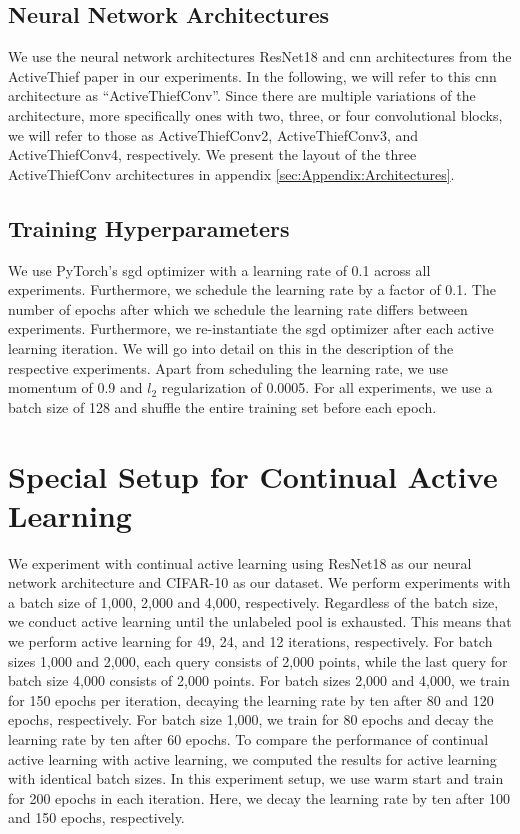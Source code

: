 \subsection{Neural Network Architectures}
\label{sec:ExperimentSetup:NNArchitectures}
We use the neural network architectures ResNet18 \cite{he2016deep} and \gls{cnn} architectures from the ActiveThief paper \cite{pal2020activethief} in our experiments.
In the following, we will refer to this \gls{cnn} architecture as \enquote{ActiveThiefConv}. Since there are multiple variations of the architecture, more specifically
ones with two, three, or four convolutional blocks, we will refer to those as ActiveThiefConv2, ActiveThiefConv3, and ActiveThiefConv4, respectively. We present the
layout of the three ActiveThiefConv architectures in appendix \ref{sec:Appendix:Architectures}.


\subsection{Training Hyperparameters}
\label{sec:ExperimentSetup:Hyperparameters}
We use PyTorch's \gls{sgd} optimizer with a learning rate of 0.1 across all experiments. Furthermore, we schedule the learning rate by a factor of 0.1. The number of
epochs after which we schedule the learning rate differs between experiments. Furthermore, we re-instantiate the \gls{sgd} optimizer after each active learning
iteration. We will go into detail on this in the description of the respective experiments. Apart from scheduling the learning rate, we use momentum \cite{cutkosky2020momentum}
of 0.9 and $l_2$ regularization of 0.0005. For all experiments, we use a batch size of 128 and shuffle the entire training set before each epoch.


\section{Special Setup for Continual Active Learning}
\label{sec:Methodology:CALsetup}
We experiment with continual active learning using ResNet18 as our neural network architecture and CIFAR-10 as our dataset. We perform experiments with a batch size of 1,000,
2,000 and 4,000, respectively. Regardless of the batch size, we conduct active learning until the unlabeled pool is exhausted. This means that we perform active learning for
49, 24, and 12 iterations, respectively. For batch sizes 1,000 and 2,000, each query consists of 2,000 points, while the last query for batch size 4,000 consists of 2,000 points.
For batch sizes 2,000 and 4,000, we train for 150 epochs per iteration, decaying the learning rate by ten after 80 and 120 epochs, respectively. For batch size 1,000, we
train for 80 epochs and decay the learning rate by ten after 60 epochs. To compare the performance of continual active learning with active learning, we computed the results
for active learning with identical batch sizes. In this experiment setup, we use warm start and train for 200 epochs in each iteration. Here, we
decay the learning rate by ten after 100 and 150 epochs, respectively.

